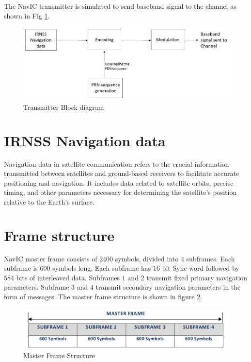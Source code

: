 The NavIC transmitter is simulated to send baseband signal to the channel as shown in Fig \ref{fig:trans_flow}. 

\begin{figure}[ht]
\centering
\includegraphics[width=1\columnwidth]{figs/trans_flow.jpg}
\centering
\captionsetup{justification=centering}
\caption{Transmitter Block diagram}
\label{fig:trans_flow}
\end{figure}

\section{IRNSS Navigation data}
Navigation data in satellite communication refers to the crucial information transmitted between satellites and ground-based receivers to facilitate accurate positioning and navigation. It includes data related to satellite orbits, precise timing, and other parameters necessary for determining the satellite's position relative to the Earth's surface.
\section{Frame structure}
NavIC master frame consists of $2400$ symbols, divided into $4$ subframes. Each subframe is $600$ symbols long. Each subframe has $16$ bit Sync word followed by $584$ bits of interleaved data. Subframes $1$ and $2$ transmit fixed primary navigation parameters. Subframe $3$ and $4$ transmit secondary navigation parameters in the form of messages. The master frame structure is shown in figure \ref{fig:master_frame}. 

\begin{figure}[ht]
\centering
\includegraphics[width=0.8\columnwidth]{figs/master_frame.png}
\centering
\captionsetup{justification=centering}
\caption{Master Frame Structure}
\label{fig:master_frame}
\end{figure}

